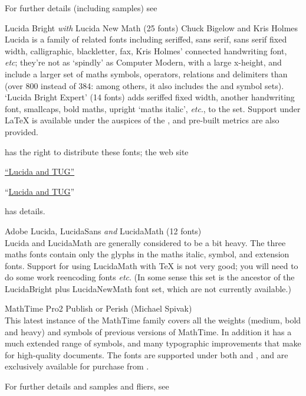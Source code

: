 \begin{booklist}
  \nothtml{\bgroup\raggedwithindent}
  For further details (including samples) see\\
  \nothtml{\par\egroup}

\item[Lucida Bright \emph{with} Lucida New Math](25 fonts) Chuck Bigelow and
  Kris Holmes\\
  Lucida is a family of related fonts including seriffed, sans serif,
  sans serif fixed width, calligraphic, blackletter, fax, Kris Holmes'
  connected handwriting font, \emph{etc}; they're not as `spindly' as
  Computer Modern, with a large x-height, and include a larger set of
  maths symbols, operators, relations and delimiters than 
  (over 800 instead of 384: among others, it also includes the
    and  symbol sets).  `Lucida
  Bright Expert' 
  (14 fonts) adds seriffed fixed width, another handwriting font,
  smallcaps, bold maths, upright `maths italic', \emph{etc}., to the
  set.  Support under \LaTeX{} is available under the auspices of the
  , and pre-built metrics are also provided.

  \nothtml{\bgroup\raggedwithindent}
   has the right to distribute these fonts; the web site
\begin{narrowversion}
    \href{http://tug.org/lucida/}{``Lucida and TUG''}
\end{narrowversion}
\begin{wideversion}
    ``\href{http://tug.org/lucida/}{Lucida and TUG}''
\end{wideversion}
  has details.
  \nothtml{\par\egroup}

\item[Adobe Lucida, LucidaSans \emph{and} LucidaMath](12 fonts)\\
  Lucida and LucidaMath are generally considered to be a bit heavy.
  The three maths fonts contain only the glyphs in the  maths
  italic, symbol, and extension fonts.  Support for using LucidaMath
  with \TeX{} is not very good; you will need to do some work
  reencoding fonts \emph{etc}.  (In some sense this set is the
  ancestor of the LucidaBright plus LucidaNewMath font set, which are
  not currently available.)

\item[MathTime Pro2]Publish or Perish (Michael Spivak)\\
  This latest instance of the MathTime family covers all the weights
  (medium, bold and heavy) and symbols of previous versions of
  MathTime.  In addition it has a much extended range of symbols, and
  many typographic improvements that make for high-quality documents.
  The fonts are supported under both \plaintex{} and \LaTeXe{}, and
  are exclusively available for purchase from
  .
  \par{}
  \nothtml{\bgroup\raggedwithindent}
  For further details and samples and fliers, see
  \nothtml{\par\egroup}


\end{booklist}
